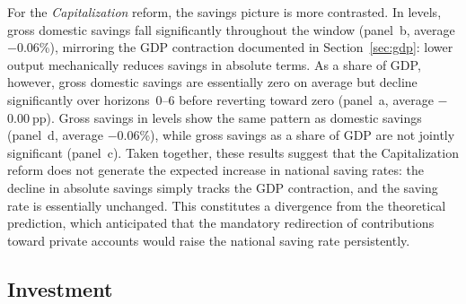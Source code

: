 \documentclass[11pt,english,a4paper, twoside, authoryear]{article}
\begin{document}
For the \textit{Capitalization} reform, the savings picture is more contrasted. In levels, gross domestic savings fall significantly throughout the window (panel~b, average $-$0.06\%), mirroring the GDP contraction documented in Section~\ref{sec:gdp}: lower output mechanically reduces savings in absolute terms. As a share of GDP, however, gross domestic savings are essentially zero on average but decline significantly over horizons~0--6 before reverting toward zero (panel~a, average $-$0.00$~$pp). Gross savings in levels show the same pattern as domestic savings (panel~d, average $-$0.06\%), while gross savings as a share of GDP are not jointly significant (panel~c). Taken together, these results suggest that the Capitalization reform does not generate the expected increase in national saving rates: the decline in absolute savings simply tracks the GDP contraction, and the saving rate is essentially unchanged. This constitutes a divergence from the theoretical prediction, which anticipated that the mandatory redirection of contributions toward private accounts would raise the national saving rate persistently.



\FloatBarrier
\subsection{Investment}
\label{sec:invest}
\label{sec:invest}
\end{document}
